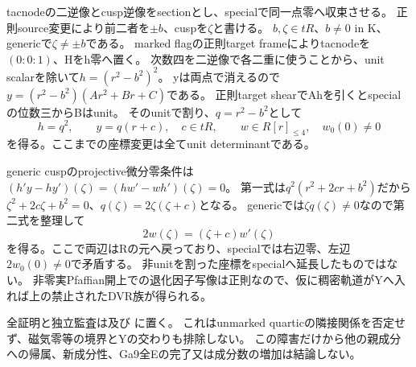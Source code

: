 \documentclass[a4paper,11pt]{ltjsarticle}
\theoremstyle{definition}
\begin{document}
tacnodeの二逆像とcusp逆像をsectionとし、specialで同一点零へ収束させる。
正則source変更により前二者を$\pm b$、cuspを$\zeta$と書ける。
$b,\zeta\in tR$、$b\ne0$ in K、genericで$\zeta\ne\pm b$である。
marked flagの正則target frameによりtacnodeを$(0:0:1)$、Hをh零へ置く。
次数四を二逆像で各二重に使うことから、unit scalarを除いて$h=(r^2-b^2)^2$。
yは両点で消えるので$y=(r^2-b^2)(Ar^2+Br+C)$である。
正則target shearでAhを引くとspecialの位数三からBはunit。
そのunitで割り、$q=r^2-b^2$として
\[
 h=q^2,\qquad y=q(r+c),\quad c\in tR,\qquad
 w\in R[r]_{\le4},\quad w_0(0)\ne0
\]
を得る。ここまでの座標変更は全てunit determinantである。

generic cuspのprojective微分零条件は
$(h'y-hy')(\zeta)=(hw'-wh')(\zeta)=0$。
第一式は$q^2(r^2+2cr+b^2)$だから
$\zeta^2+2c\zeta+b^2=0$、$q(\zeta)=2\zeta(\zeta+c)$となる。
genericでは$\zeta q(\zeta)\ne0$なので第二式を整理して
\[
 2w(\zeta)=(\zeta+c)w'(\zeta)
\]
を得る。ここで両辺はRの元へ戻っており、specialでは右辺零、左辺$2w_0(0)\ne0$で矛盾する。
非unitを割った座標をspecialへ延長したものではない。
非零実Pfaffian開上での退化因子写像は正則なので、仮に稠密軌道がYへ入れば上の禁止されたDVR族が得られる。

全証明と独立監査は及び
に置く。
これはunmarked quarticの隣接関係を否定せず、磁気零等の境界とYの交わりも排除しない。
この障害だけから他の親成分への帰属、新成分性、Ga9全Eの完了又は成分数の増加は結論しない。
\end{document}
